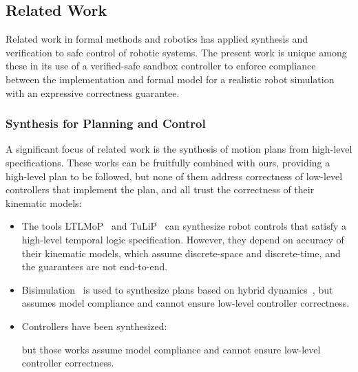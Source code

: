 \documentclass[12pt]{cmuthesis}
\theoremstyle{definition}
\theoremstyle{remark}
\begin{document}
\subsection{Related Work}
Related work in formal methods and robotics has applied synthesis and verification to safe control of robotic systems.
The present work is unique among these in its use of a verified-safe sandbox controller to enforce compliance between the implementation and formal model for a realistic robot simulation with an expressive correctness guarantee.

\subsubsection{Synthesis for Planning and Control}
A significant focus of related work is the synthesis of motion plans from high-level specifications.
These works can be fruitfully combined with ours, providing a high-level plan to be followed, but none of them address correctness of low-level controllers that implement the plan, and all trust the correctness of their kinematic models:
\begin{itemize}
\item The tools LTLMoP~\cite{DBLP:conf/iros/FinucaneJK10} and TuLiP~\cite{DBLP:conf/IEEEcca/FilippidisDLOM16} can synthesize robot controls that satisfy a high-level temporal logic specification.
However, they depend on accuracy of their kinematic models, which assume  discrete-space and discrete-time, and the guarantees are not end-to-end.
\item Bisimulation~\cite{871304} is used to synthesize plans based on hybrid dynamics~\cite{DBLP:conf/cdc/BhatiaKV10,DBLP:journals/automatica/FainekosGKP09}, but assumes model compliance and cannot ensure low-level controller correctness.
\item Controllers have been synthesized:
but those works assume model compliance and cannot ensure low-level controller correctness.
\end{itemize}
\end{document}
